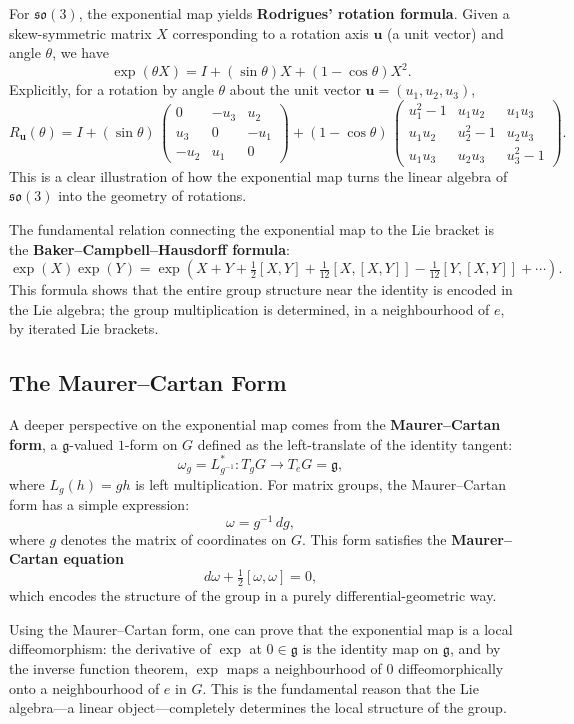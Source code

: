 For $\mathfrak{so}(3)$, the exponential map yields \textbf{Rodrigues' rotation formula}. Given a skew-symmetric matrix $X$ corresponding to a rotation axis $\mathbf{u}$ (a unit vector) and angle $\theta$, we have
\[
\exp(\theta X) = I + (\sin\theta) X + (1 - \cos\theta) X^2.
\]
Explicitly, for a rotation by angle $\theta$ about the unit vector $\mathbf{u} = (u_1,u_2,u_3)$,
\[
R_{\mathbf{u}}(\theta) = I + (\sin\theta)\,
\begin{pmatrix}
0 & -u_3 & u_2 \\
u_3 & 0 & -u_1 \\
-u_2 & u_1 & 0
\end{pmatrix}
+ (1-\cos\theta)\,
\begin{pmatrix}
u_1^2-1 & u_1u_2 & u_1u_3 \\
u_1u_2 & u_2^2-1 & u_2u_3 \\
u_1u_3 & u_2u_3 & u_3^2-1
\end{pmatrix}.
\]
This is a clear illustration of how the exponential map turns the linear algebra of $\mathfrak{so}(3)$ into the geometry of rotations.

The fundamental relation connecting the exponential map to the Lie bracket is the \textbf{Baker--Campbell--Hausdorff formula}:
\[
    \exp(X)\exp(Y) = \exp\!\left(X + Y + \tfrac{1}{2}[X,Y] + \tfrac{1}{12}[X,[X,Y]] - \tfrac{1}{12}[Y,[X,Y]] + \cdots\right).
\]
This formula shows that the entire group structure near the identity is encoded in the Lie algebra; the group multiplication is determined, in a neighbourhood of $e$, by iterated Lie brackets.

\subsection{The Maurer--Cartan Form}

A deeper perspective on the exponential map comes from the \textbf{Maurer--Cartan form}, a $\mathfrak{g}$-valued $1$-form on $G$ defined as the left-translate of the identity tangent:
\[
\omega_g = L_{g^{-1}}^* \colon T_g G \to T_e G = \mathfrak{g},
\]
where $L_g(h) = gh$ is left multiplication. For matrix groups, the Maurer--Cartan form has a simple expression:
\[
\omega = g^{-1}\, dg,
\]
where $g$ denotes the matrix of coordinates on $G$. This form satisfies the \textbf{Maurer--Cartan equation}
\[
d\omega + \tfrac12 [\omega, \omega] = 0,
\]
which encodes the structure of the group in a purely differential-geometric way.

Using the Maurer--Cartan form, one can prove that the exponential map is a local diffeomorphism: the derivative of $\exp$ at $0 \in \mathfrak{g}$ is the identity map on $\mathfrak{g}$, and by the inverse function theorem, $\exp$ maps a neighbourhood of $0$ diffeomorphically onto a neighbourhood of $e$ in $G$. This is the fundamental reason that the Lie algebra---a linear object---completely determines the local structure of the group.


